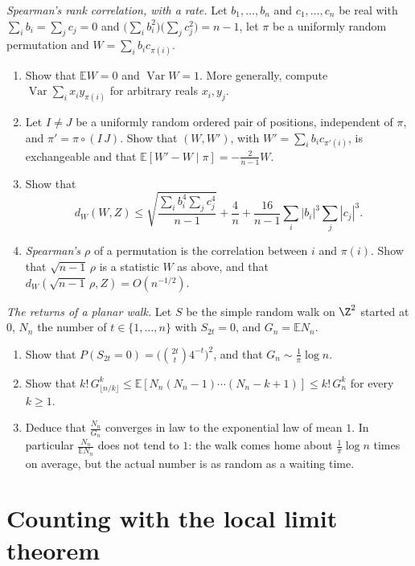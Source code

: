 \begin{exercise}[$\star\star\star$]\label{pb:spearman}
\emph{Spearman's rank correlation, with a rate.} Let $b_1,\dots,b_n$ and $c_1,\dots,c_n$ be real with $\sum_ib_i=\sum_jc_j=0$ and $\bigl(\sum_ib_i^2\bigr)\bigl(\sum_jc_j^2\bigr)=n-1$,
let $\pi$ be a uniformly random permutation and $W=\sum_ib_ic_{\pi(i)}$.
\begin{enumerate}[label=(\alph*)]
\item Show that $\mathbb EW=0$ and $\operatorname{Var}W=1$. More generally, compute $\operatorname{Var}\sum_ix_iy_{\pi(i)}$ for arbitrary reals $x_i,y_j$.
\item Let $I\ne J$ be a uniformly random ordered pair of positions, independent of $\pi$, and $\pi'=\pi\circ(I\,J)$. Show that $(W,W')$, with
$W'=\sum_ib_ic_{\pi'(i)}$, is exchangeable and that $\mathbb E[W'-W\mid\pi]=-\frac2{n-1}W$.
\item Show that
\[
d_W(W,Z)\le\sqrt{\frac{\sum_ib_i^4\sum_jc_j^4}{n-1}}+\frac4n+\frac{16}{n-1}\sum_i|b_i|^3\sum_j|c_j|^3.
\]
\item \emph{Spearman's $\rho$} of a permutation is the correlation between $i$ and $\pi(i)$. Show that $\sqrt{n-1}\,\rho$ is a statistic $W$ as above, and that
$d_W(\sqrt{n-1}\,\rho,Z)=O(n^{-1/2})$.
\end{enumerate}
\end{exercise}

\begin{exercise}[$\star\star\star$]\label{pb:erdostaylor}
\emph{The returns of a planar walk.} Let $S$ be the simple random walk on $\Z^2$ started at $0$, $N_n$ the number of $t\in\{1,\dots,n\}$ with $S_{2t}=0$, and
$G_n=\mathbb EN_n$.
\begin{enumerate}[label=(\alph*)]
\item Show that $P(S_{2t}=0)=\bigl(\binom{2t}t4^{-t}\bigr)^2$, and that $G_n\sim\frac1\pi\log n$.
\item Show that $k!\,G_{\lfloor n/k\rfloor}^k\le\mathbb E[N_n(N_n-1)\cdots(N_n-k+1)]\le k!\,G_n^k$ for every $k\ge1$.
\item Deduce that $\frac{N_n}{G_n}$ converges in law to the exponential law of mean $1$. In particular $\frac{N_n}{\mathbb EN_n}$ does not tend to $1$: the walk comes home
about $\frac1\pi\log n$ times on average, but the actual number is as random as a waiting time.
\end{enumerate}
\end{exercise}

\section{Counting with the local limit theorem}

